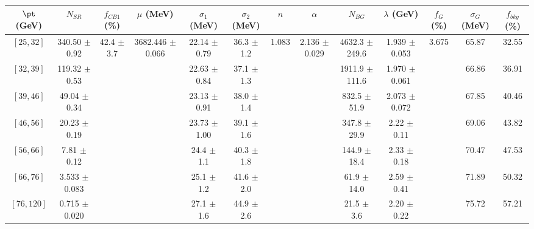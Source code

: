 \begin{tabular}{c||c|c|c|c|c|c|c|c|c|c|c||c}
$\pt$ (GeV) & $N_{SR}$ & $f_{CB1}$ (\%) & $\mu$ (MeV) & $\sigma_1$ (MeV) & $\sigma_2$ (MeV) & $n$ & $\alpha$ & $N_{BG}$ & $\lambda$ (GeV) & $f_G$ (\%) & $\sigma_G$ (MeV) & $f_{bkg}$ (\%) \\
\hline
$[25, 32]$ & 340.50 $\pm$ 0.92 & \multirow{7}{*}{42.4 $\pm$ 3.7} & \multirow{7}{*}{3682.446 $\pm$ 0.066} & 22.14 $\pm$ 0.79 & 36.3 $\pm$ 1.2 & \multirow{7}{*}{1.083} & \multirow{7}{*}{2.136 $\pm$ 0.029} & 4632.3 $\pm$ 249.6 & 1.939 $\pm$ 0.053 & \multirow{7}{*}{3.675} & 65.87 & 32.55\\
$[32, 39]$ & 119.32 $\pm$ 0.53 &  &  & 22.63 $\pm$ 0.84 & 37.1 $\pm$ 1.3 &  &  & 1911.9 $\pm$ 111.6 & 1.970 $\pm$ 0.061 &  & 66.86 & 36.91\\
$[39, 46]$ & 49.04 $\pm$ 0.34 &  &  & 23.13 $\pm$ 0.91 & 38.0 $\pm$ 1.4 &  &  & 832.5 $\pm$ 51.9 & 2.073 $\pm$ 0.072 &  & 67.85 & 40.46\\
$[46, 56]$ & 20.23 $\pm$ 0.19 &  &  & 23.73 $\pm$ 1.00 & 39.1 $\pm$ 1.6 &  &  & 347.8 $\pm$ 29.9 & 2.22 $\pm$ 0.11 &  & 69.06 & 43.82\\
$[56, 66]$ & 7.81 $\pm$ 0.12 &  &  & 24.4 $\pm$ 1.1 & 40.3 $\pm$ 1.8 &  &  & 144.9 $\pm$ 18.4 & 2.33 $\pm$ 0.18 &  & 70.47 & 47.53\\
$[66, 76]$ & 3.533 $\pm$ 0.083 &  &  & 25.1 $\pm$ 1.2 & 41.6 $\pm$ 2.0 &  &  & 61.9 $\pm$ 14.0 & 2.59 $\pm$ 0.41 &  & 71.89 & 50.32\\
$[76, 120]$ & 0.715 $\pm$ 0.020 &  &  & 27.1 $\pm$ 1.6 & 44.9 $\pm$ 2.6 &  &  & 21.5 $\pm$ 3.6 & 2.20 $\pm$ 0.22 &  & 75.72 & 57.21\\
\end{tabular}
